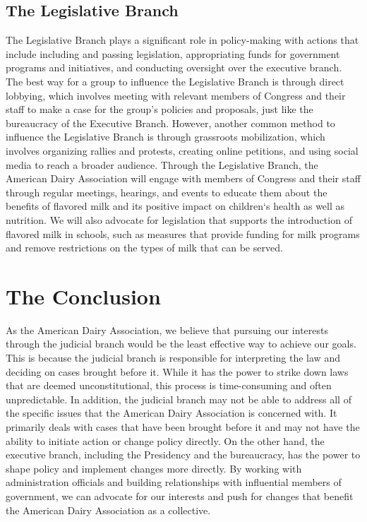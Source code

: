\documentclass[a4paper, 12pt]{article}
\begin{document}
\subsection{The Legislative Branch}
\hspace{\parindent} The Legislative Branch plays a significant role in policy-making with actions that include including and passing legislation, appropriating funds for government programs and initiatives, and conducting oversight over the executive branch. The best way for a group to influence the Legislative Branch is through direct lobbying, which involves meeting with relevant members of Congress and their staff to make a case for the group's policies and proposals, just like the bureaucracy of the Executive Branch. However, another common method to influence the Legislative Branch is through grassroots mobilization, which involves organizing rallies and protests, creating online petitions, and using social media to reach a broader audience. Through the Legislative Branch, the American Dairy Association will engage with members of Congress and their staff through regular meetings, hearings, and events to educate them about the benefits of flavored milk and its positive impact on children`s health as well as nutrition. We will also advocate for legislation that supports the introduction of flavored milk in schools, such as measures that provide funding for milk programs and remove restrictions on the types of milk that can be served. 

\section{The Conclusion}
\hspace{\parindent} As the American Dairy Association, we believe that pursuing our interests through the judicial branch would be the least effective way to achieve our goals. This is because the judicial branch is responsible for interpreting the law and deciding on cases brought before it. While it has the power to strike down laws that are deemed unconstitutional, this process is time-consuming and often unpredictable. In addition, the judicial branch may not be able to address all of the specific issues that the American Dairy Association is concerned with. It primarily deals with cases that have been brought before it and may not have the ability to initiate action or change policy directly. On the other hand, the executive branch, including the Presidency and the bureaucracy, has the power to shape policy and implement changes more directly. By working with administration officials and building relationships with influential members of government, we can advocate for our interests and push for changes that benefit the American Dairy Association as a collective. 
\end{document}
